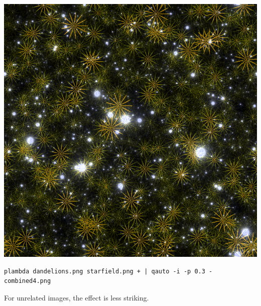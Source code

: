 \includegraphics{combined4.png}
\begin{verbatim}
plambda dandelions.png starfield.png + | qauto -i -p 0.3 - combined4.png
\end{verbatim}
For unrelated images, the effect is less striking.










